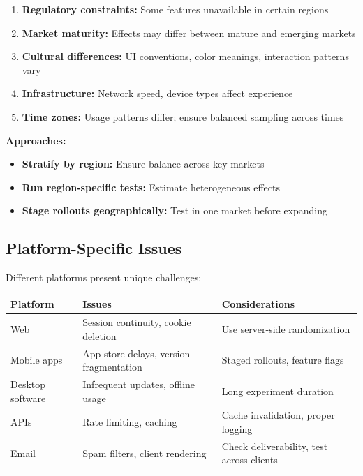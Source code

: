 \begin{enumerate}
    \item \textbf{Regulatory constraints:} Some features unavailable in certain regions

    \item \textbf{Market maturity:} Effects may differ between mature and emerging markets

    \item \textbf{Cultural differences:} UI conventions, color meanings, interaction patterns vary

    \item \textbf{Infrastructure:} Network speed, device types affect experience

    \item \textbf{Time zones:} Usage patterns differ; ensure balanced sampling across times
\end{enumerate}

\textbf{Approaches:}

\begin{itemize}
    \item \textbf{Stratify by region:} Ensure balance across key markets
    \item \textbf{Run region-specific tests:} Estimate heterogeneous effects
    \item \textbf{Stage rollouts geographically:} Test in one market before expanding
\end{itemize}

\subsection{Platform-Specific Issues}

Different platforms present unique challenges:

\begin{table}[h]
\centering
\small
\begin{tabular}{lll}
\hline
\textbf{Platform} & \textbf{Issues} & \textbf{Considerations} \\
\hline
Web & Session continuity, cookie deletion & Use server-side randomization \\
Mobile apps & App store delays, version fragmentation & Staged rollouts, feature flags \\
Desktop software & Infrequent updates, offline usage & Long experiment duration \\
APIs & Rate limiting, caching & Cache invalidation, proper logging \\
Email & Spam filters, client rendering & Check deliverability, test across clients \\
\hline
\end{tabular}
\end{table}

